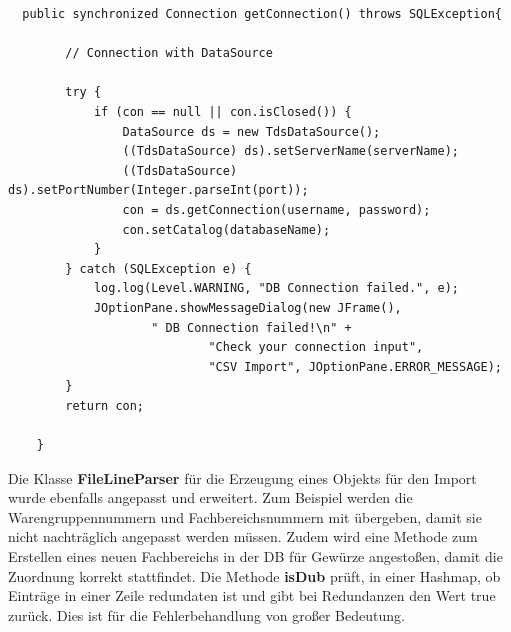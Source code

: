 \begin{lstlisting}
  public synchronized Connection getConnection() throws SQLException{

		// Connection with DataSource

		try {
			if (con == null || con.isClosed()) {
				DataSource ds = new TdsDataSource();
				((TdsDataSource) ds).setServerName(serverName);
				((TdsDataSource) ds).setPortNumber(Integer.parseInt(port));
				con = ds.getConnection(username, password);
				con.setCatalog(databaseName);
			}
		} catch (SQLException e) {
			log.log(Level.WARNING, "DB Connection failed.", e);
			JOptionPane.showMessageDialog(new JFrame(),
					" DB Connection failed!\n" +
							"Check your connection input",
							"CSV Import", JOptionPane.ERROR_MESSAGE);
		}
		return con;

	}
\end{lstlisting}

Die Klasse \textbf{FileLineParser} für die Erzeugung eines Objekts für den Import wurde ebenfalls angepasst und erweitert. Zum Beispiel werden die Warengruppennummern und Fachbereichsnummern mit übergeben, damit sie nicht nachträglich angepasst werden müssen. Zudem wird eine Methode zum Erstellen eines neuen Fachbereichs in der DB für Gewürze angestoßen, damit die Zuordnung korrekt stattfindet. Die Methode \textbf{isDub} prüft, in einer Hashmap, ob Einträge in einer Zeile redundaten ist und gibt bei Redundanzen den Wert true zurück. Dies ist für die Fehlerbehandlung von großer Bedeutung.

